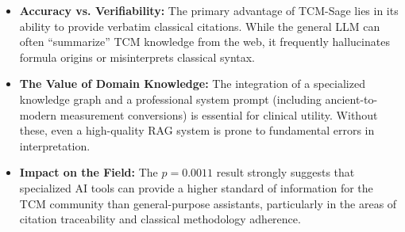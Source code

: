 \begin{itemize}
    \item \textbf{Accuracy vs. Verifiability:} The primary advantage of TCM-Sage lies in its ability to provide verbatim classical citations. While the general LLM can often ``summarize'' TCM knowledge from the web, it frequently hallucinates formula origins or misinterprets classical syntax.
    \item \textbf{The Value of Domain Knowledge:} The integration of a specialized knowledge graph and a professional system prompt (including ancient-to-modern measurement conversions) is essential for clinical utility. Without these, even a high-quality RAG system is prone to fundamental errors in interpretation.
    \item \textbf{Impact on the Field:} The $p = 0.0011$ result strongly suggests that specialized AI tools can provide a higher standard of information for the TCM community than general-purpose assistants, particularly in the areas of citation traceability and classical methodology adherence.
\end{itemize}

